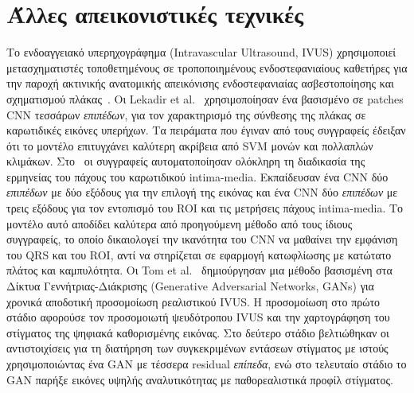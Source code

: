 \section{Άλλες απεικονιστικές τεχνικές}
Το ενδοαγγειακό υπερηχογράφημα (Intravascular Ultrasound, IVUS) χρησιμοποιεί μετασχηματιστές τοποθετημένους σε τροποποιημένους ενδοστεφανιαίους καθετήρες για την παροχή ακτινικής ανατομικής απεικόνισης ενδοστεφανιαίας ασβεστοποίησης και σχηματισμού πλάκας~\cite{parrillo2013critical}.
Οι Lekadir et al.~\cite{lekadir2017convolutional} χρησιμοποίησαν ένα βασισμένο σε patches CNN τεσσάρων \textit{επιπέδων}, για τον χαρακτηρισμό της σύνθεσης της πλάκας σε καρωτιδικές εικόνες υπερήχων.
Τα πειράματα που έγιναν από τους συγγραφείς έδειξαν ότι το μοντέλο επιτυγχάνει καλύτερη ακρίβεια από SVM μονών και πολλαπλών κλιμάκων.
Στο~\cite{tajbakhsh2017automatic} οι συγγραφείς αυτοματοποίησαν ολόκληρη τη διαδικασία της ερμηνείας του πάχους του καρωτιδικού intima-media.
Εκπαίδευσαν ένα CNN δύο \textit{επιπέδων} με δύο εξόδους για την επιλογή της εικόνας και ένα CNN δύο \textit{επιπέδων} με τρεις εξόδους για τον εντοπισμό του ROI και τις μετρήσεις πάχους intima-media.
Το μοντέλο αυτό αποδίδει καλύτερα από προηγούμενη μέθοδο από τους ίδιους συγγραφείς, το οποίο δικαιολογεί την ικανότητα του CNN να μαθαίνει την εμφάνιση του QRS και του ROI, αντί να στηρίζεται σε εφαρμογή κατωφλίωσης με κατώτατο πλάτος και καμπυλότητα.
Οι Tom et al.~\cite{tom2018simulating} δημιούργησαν μια μέθοδο βασισμένη στα Δίκτυα Γεννήτριας-Διάκρισης (Generative Adversarial Networks, GANs) για χρονικά αποδοτική προσομοίωση ρεαλιστικού IVUS\@.
Η προσομοίωση στο πρώτο στάδιο αφορούσε τον προσομοιωτή ψευδότροπου IVUS και την χαρτογράφηση του στίγματος της ψηφιακά καθορισμένης εικόνας.
Στο δεύτερο στάδιο βελτιώθηκαν οι αντιστοιχίσεις για τη διατήρηση των συγκεκριμένων εντάσεων στίγματος με ιστούς χρησιμοποιώντας ένα GAN με τέσσερα residual \textit{επίπεδα}, ενώ στο τελευταίο στάδιο το GAN παρήξε εικόνες υψηλής αναλυτικότητας με παθορεαλιστικά προφίλ στίγματος.


